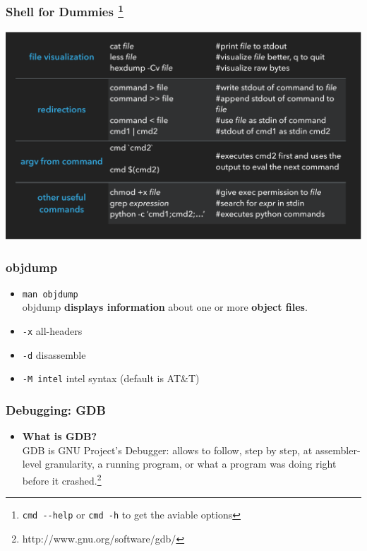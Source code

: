 \documentclass[]{beamer}
\begin{document}
\begin{frame}
  \frametitle{Shell for Dummies \footnote{\texttt{cmd -{}-help} or \texttt{cmd -h} to get the aviable options}}
  \hspace*{-11mm}
  \includegraphics[width=\paperwidth]{./images/shell_2.pdf}
\end{frame}

\begin{frame}
  \frametitle{objdump}
  \begin{itemize}
  \item{{\tt man objdump}}\\
objdump \textbf{displays information} about one or more \textbf{object files}.
  \item{\texttt{-x}} all-headers
  \item{\texttt{-d}} disassemble
  \item{\texttt{-M intel}} intel syntax (default is AT\&T)
  \end{itemize}
\end{frame}

\begin{frame}
  \frametitle{Debugging: GDB}
  \begin{itemize}
  \item{{\bf What is GDB?}}\\
    GDB is GNU Project's Debugger: allows to follow, step by step, at assembler-level granularity, a running program, or what a program was doing right before it crashed.\footnote{http://www.gnu.org/software/gdb/}
  \end{itemize}
\end{frame}
\end{document}
